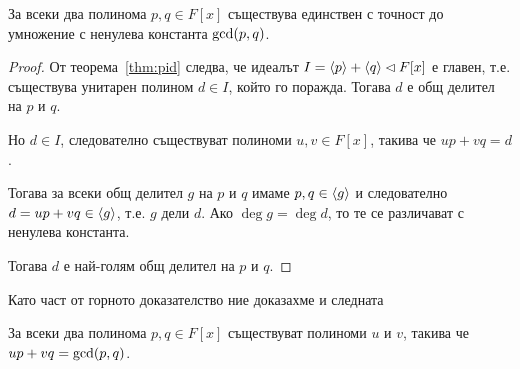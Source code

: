 \documentclass[numbers=endperiod, DIV=15]{scrartcl}
\begin{document}
\begin{theorem}
  За всеки два полинома $p, q \in F[x]$ съществува единствен с точност до умножение с ненулева константа $\operatorname{gcd}(p, q)$.
\end{theorem}
\begin{proof}
  От теорема~\ref{thm:pid} следва, че идеалът $I = \left\langle p \right\rangle + \left\langle q \right\rangle \lhd F[x]$ е главен, т.е. съществува унитарен полином $d \in I$, който го поражда.
  Тогава $d$ е общ делител на $p$ и $q$.

  Но $d \in I$, следователно съществуват полиноми $u, v \in F[x]$, такива че $u p + v q = d$.

  Тогава за всеки общ делител $g$ на $p$ и $q$ имаме $p, q \in \left\langle g \right\rangle$ и следователно $d = u p + v q \in \left\langle g \right\rangle$, т.е. $g$ дели $d$. Ако $\deg g = \deg d$, то те се различават с ненулева константа.

  Тогава $d$ е най-голям общ делител на $p$ и $q$.
\end{proof}

Като част от горното доказателство ние доказахме и следната
\begin{theorem}
  За всеки два полинома $p, q \in F[x]$ съществуват полиноми $u$ и $v$, такива че $u p + v q = \operatorname{gcd}(p, q)$.
\end{theorem}
\end{document}
